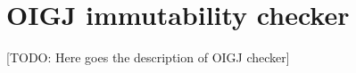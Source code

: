 \htmlhr
\chapter{OIGJ immutability checker\label{oigj-checker}}

[TODO: Here goes the description of OIGJ checker]

